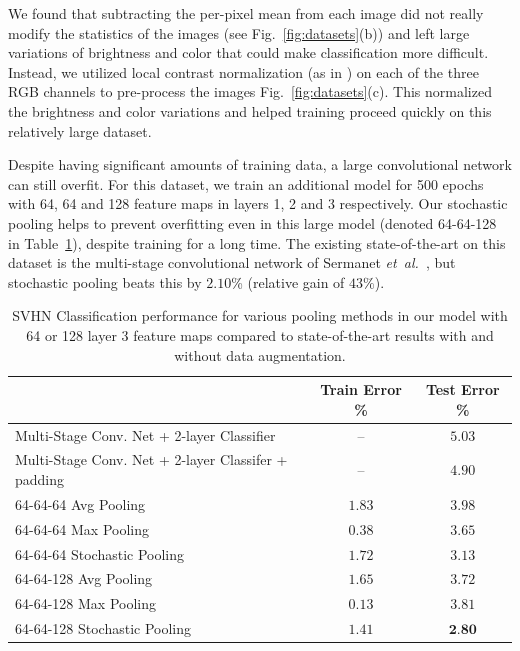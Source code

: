 \documentclass{article} %
\newcommand{\fig}[1]{Fig.~\ref{fig:#1}}
\newcommand{\tab}[1]{Table~\ref{tab:#1}}
\def\etal{{\textit{et~al.~}}}
\begin{document}
We found that subtracting the per-pixel mean from each image did not
really modify the statistics of the images (see \fig{datasets}(b)) and
left large variations of brightness and color that could make
classification more difficult. Instead, we utilized local contrast
normalization  (as in \cite{Sermanet11}) on each of the three RGB channels to pre-process the
images \fig{datasets}(c). This normalized the brightness and color
variations and helped training proceed quickly on this relatively
large dataset.

Despite having significant amounts of training data, a large
convolutional network can still overfit. For this dataset, we train an additional model for 500
epochs with 64, 64 and 128 feature maps in layers 1, 2 and 3 respectively. Our stochastic pooling
helps to prevent overfitting even in this large model (denoted 64-64-128 in \tab{svhn}), despite
training for a long time. The existing
state-of-the-art on this dataset is the multi-stage
convolutional network of Sermanet \etal \cite{Sermanet11}, but
stochastic pooling beats this by $2.10$\% (relative gain of $43\%$).

\begin{table}[h!]
\small
\vspace*{-2mm}
\begin{center}
\begin{tabular}{|l|c|c|}
  \hline
  & Train Error \% & Test Error \% \\
  \hline Multi-Stage Conv. Net + 2-layer Classifier  \cite{Sermanet11} & -- & $5.03$ \\
  \hline Multi-Stage Conv. Net + 2-layer Classifer + padding \cite{Sermanet11} & -- & $4.90$ \\
  \hline \hline   %
  64-64-64 Avg Pooling  & $1.83$ & $3.98$ \\
  \hline %
  64-64-64 Max Pooling  & $0.38$ & $3.65$ \\
  \hline %
  64-64-64 Stochastic Pooling  & $1.72$ & $3.13$ \\ %
  \hline \hline   %
  64-64-128 Avg Pooling  & $1.65$ & $3.72$ \\
  \hline %
  64-64-128 Max Pooling  & $0.13$ & $3.81$ \\
  \hline %
  64-64-128 Stochastic Pooling  & $1.41$ & $\textbf{2.80}$ \\ %
  \hline
\end{tabular}
\vspace*{-2mm}
\caption{SVHN Classification performance for various pooling methods in
  our model with 64 or 128 layer 3 feature maps compared to state-of-the-art results with and
  without data augmentation.}
\label{tab:svhn}
\vspace*{-6mm}
\end{center}
\end{table}
\end{document}
